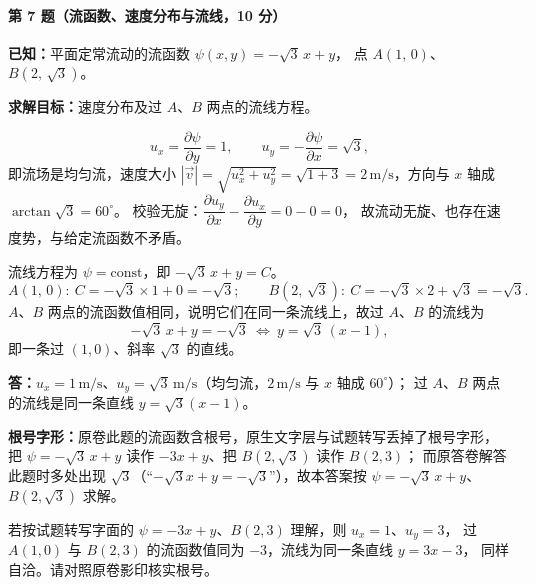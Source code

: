 \paragraph{第 7 题（流函数、速度分布与流线，10 分）}
\begin{jie}
\textbf{已知：}平面定常流动的流函数 $\psi(x,y)=-\sqrt{3}\,x+y$，
点 $A(1,\,0)$、$B(2,\,\sqrt{3})$。

\textbf{求解目标：}速度分布及过 $A$、$B$ 两点的流线方程。

\[
u_x=\frac{\partial\psi}{\partial y}=1,\qquad
u_y=-\frac{\partial\psi}{\partial x}=\sqrt{3},
\]
即流场是均匀流，速度大小
$|\vec v|=\sqrt{u_x^{2}+u_y^{2}}=\sqrt{1+3}=2\,\mathrm{m/s}$，方向与 $x$ 轴成 $\arctan\sqrt{3}=60^{\circ}$。
校验无旋：$\dfrac{\partial u_y}{\partial x}-\dfrac{\partial u_x}{\partial y}=0-0=0$，
故流动无旋、也存在速度势，与给定流函数不矛盾。

流线方程为 $\psi=\text{const}$，即 $-\sqrt{3}\,x+y=C$。
\[
A(1,\,0):\ C=-\sqrt{3}\times1+0=-\sqrt{3};\qquad
B(2,\,\sqrt{3}):\ C=-\sqrt{3}\times2+\sqrt{3}=-\sqrt{3}.
\]
$A$、$B$ 两点的流函数值相同，说明它们在同一条流线上，故过 $A$、$B$ 的流线为
\[
-\sqrt{3}\,x+y=-\sqrt{3}
\ \Longleftrightarrow\
y=\sqrt{3}\,(x-1),
\]
即一条过 $(1,0)$、斜率 $\sqrt{3}$ 的直线。

\textbf{答：}$u_x=1\,\mathrm{m/s}$、$u_y=\sqrt{3}\,\mathrm{m/s}$（均匀流，$2\,\mathrm{m/s}$ 与 $x$ 轴成 $60^{\circ}$）；
过 $A$、$B$ 两点的流线是同一条直线 $y=\sqrt{3}(x-1)$。
\end{jie}

\begin{tishi}
\textbf{根号字形：}原卷此题的流函数含根号，原生文字层与试题转写丢掉了根号字形，
把 $\psi=-\sqrt{3}\,x+y$ 读作 $-3x+y$、把 $B(2,\sqrt{3})$ 读作 $B(2,3)$；
而原答卷解答此题时多处出现 $\sqrt{3}$（``$-\sqrt{3}x+y=-\sqrt{3}$''），故本答案按
$\psi=-\sqrt{3}\,x+y$、$B(2,\sqrt{3})$ 求解。

若按试题转写字面的 $\psi=-3x+y$、$B(2,3)$ 理解，则 $u_x=1$、$u_y=3$，
过 $A(1,0)$ 与 $B(2,3)$ 的流函数值同为 $-3$，流线为同一条直线 $y=3x-3$，
同样自洽。请对照原卷影印核实根号。
\end{tishi}

